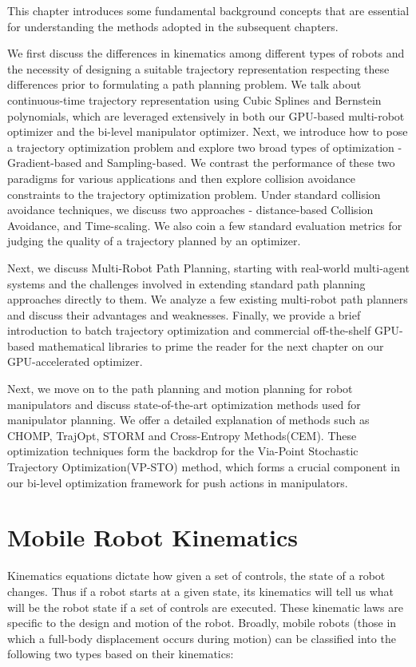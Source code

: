 This chapter introduces some fundamental background concepts that are essential for understanding the methods adopted in the subsequent chapters.

We first discuss the differences in kinematics among different types of robots and the necessity of designing a suitable trajectory representation respecting these differences prior to formulating a path planning problem. We talk about continuous-time trajectory representation using Cubic Splines and Bernstein polynomials, which are leveraged extensively in both our GPU-based multi-robot optimizer and the bi-level manipulator optimizer. Next, we introduce how to pose a trajectory optimization problem and explore two broad types of optimization - Gradient-based and Sampling-based. We contrast the performance of these two paradigms for various applications and then explore collision avoidance constraints to the trajectory optimization problem. Under standard collision avoidance techniques, we discuss two approaches - distance-based Collision Avoidance, and Time-scaling. We also coin a few standard evaluation metrics for judging the quality of a trajectory planned by an optimizer.

Next, we discuss Multi-Robot Path Planning, starting with real-world multi-agent systems and the challenges involved in extending standard path planning approaches directly to them. We analyze a few existing multi-robot path planners and discuss their advantages and weaknesses. Finally, we provide a brief introduction to batch trajectory optimization and commercial off-the-shelf GPU-based mathematical libraries to prime the reader for the next chapter on our GPU-accelerated optimizer.

Next, we move on to the path planning and motion planning for robot manipulators and discuss state-of-the-art optimization methods used for manipulator planning. We offer a detailed explanation of methods such as CHOMP\cite{CHOMP}, TrajOpt\cite{TrajOpt}, STORM\cite{STORM} and Cross-Entropy Methods(CEM)\cite{iCEM}. These optimization techniques form the backdrop for the Via-Point Stochastic Trajectory Optimization(VP-STO)\cite{VP-STO} method, which forms a crucial component in our bi-level optimization framework for push actions in manipulators.

\section{Mobile Robot Kinematics}

Kinematics equations dictate how given a set of controls, the state of a robot changes. Thus if a robot starts at a given state, its kinematics will tell us what will be the robot state if a set of controls are executed. These kinematic laws are specific to the design and motion of the robot. Broadly, mobile robots (those in which a full-body displacement occurs during motion) can be classified into the following two types based on their kinematics:

